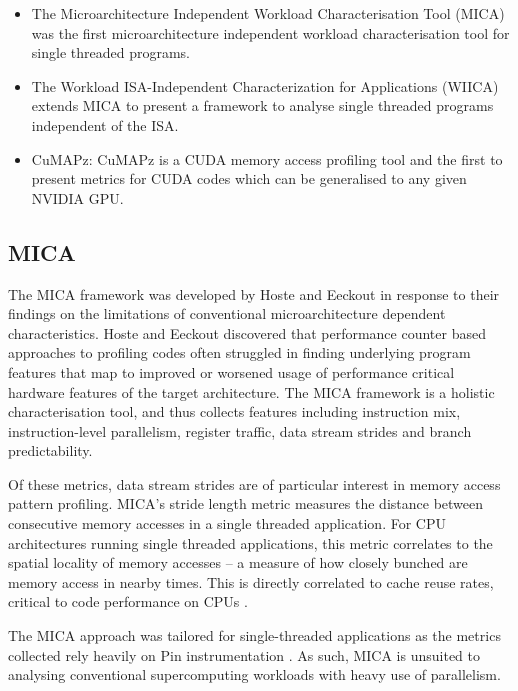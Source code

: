 \documentclass[review=false, sigchi]{acmart}
\begin{document}
	\begin{itemize}
		\item The Microarchitecture Independent Workload Characterisation Tool (MICA) \cite{hoste2007microarchitecture} was the first microarchitecture independent workload characterisation tool for single threaded programs. 
		\item The Workload ISA-Independent Characterization for Applications (WIICA) \cite{shao2013isa} extends MICA to present a framework to analyse single threaded programs independent of the ISA.
		\item CuMAPz: CuMAPz \cite{kim2011cumapz} is a CUDA memory access profiling tool and the first to present metrics for CUDA codes which can be generalised to any given NVIDIA GPU.
	\end{itemize}
	
	\subsection{MICA}
	
	The MICA framework was developed by Hoste and Eeckout \cite{hoste2007microarchitecture} in response to their findings on the limitations of conventional microarchitecture dependent characteristics. Hoste and Eeckout discovered that performance counter based approaches to profiling codes often struggled in finding underlying program features that map to improved or worsened usage of performance critical hardware features of the target architecture. The MICA framework is a holistic characterisation tool, and thus collects features including instruction mix, instruction-level parallelism, register traffic, data stream strides and branch predictability.
	
	Of these metrics, data stream strides are of particular interest in memory access pattern profiling. MICA's stride length metric measures the distance between consecutive memory accesses in a single threaded application. For CPU architectures running single threaded applications, this metric correlates to the spatial locality of memory accesses -- a measure of how closely bunched are memory access in nearby times. This is directly correlated to cache reuse rates, critical to code performance on CPUs \cite{inteloptimisation}. %
	
	The MICA approach was tailored for single-threaded applications as the metrics collected rely heavily on Pin instrumentation \cite{luk2005pin}. As such, MICA is unsuited to analysing conventional supercomputing workloads with heavy use of parallelism.
\end{document}
